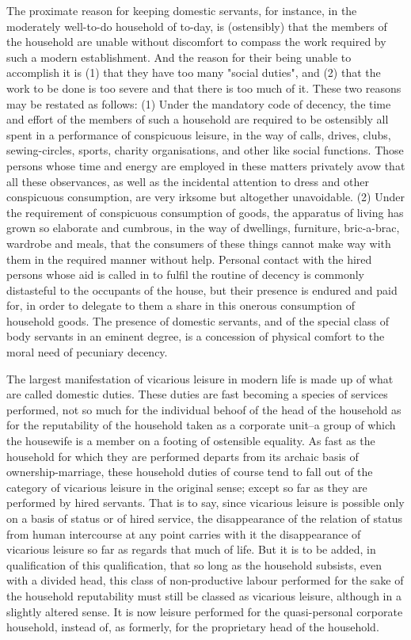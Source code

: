 \documentclass[12pt]{report}
\begin{document}
The proximate reason for keeping domestic servants, for instance, in
the moderately well-to-do household of to-day, is (ostensibly) that the
members of the household are unable without discomfort to compass the
work required by such a modern establishment. And the reason for their
being unable to accomplish it is (1) that they have too many "social
duties", and (2) that the work to be done is too severe and that there
is too much of it. These two reasons may be restated as follows: (1)
Under the mandatory code of decency, the time and effort of the members
of such a household are required to be ostensibly all spent in a
performance of conspicuous leisure, in the way of calls, drives, clubs,
sewing-circles, sports, charity organisations, and other like social
functions. Those persons whose time and energy are employed in these
matters privately avow that all these observances, as well as the
incidental attention to dress and other conspicuous consumption, are
very irksome but altogether unavoidable. (2) Under the requirement of
conspicuous consumption of goods, the apparatus of living has grown so
elaborate and cumbrous, in the way of dwellings, furniture, bric-a-brac,
wardrobe and meals, that the consumers of these things cannot make way
with them in the required manner without help. Personal contact with the
hired persons whose aid is called in to fulfil the routine of decency is
commonly distasteful to the occupants of the house, but their presence
is endured and paid for, in order to delegate to them a share in
this onerous consumption of household goods. The presence of domestic
servants, and of the special class of body servants in an eminent
degree, is a concession of physical comfort to the moral need of
pecuniary decency.

The largest manifestation of vicarious leisure in modern life is made
up of what are called domestic duties. These duties are fast becoming a
species of services performed, not so much for the individual behoof of
the head of the household as for the reputability of the household taken
as a corporate unit--a group of which the housewife is a member on a
footing of ostensible equality. As fast as the household for which they
are performed departs from its archaic basis of ownership-marriage,
these household duties of course tend to fall out of the category of
vicarious leisure in the original sense; except so far as they are
performed by hired servants. That is to say, since vicarious leisure
is possible only on a basis of status or of hired service, the
disappearance of the relation of status from human intercourse at any
point carries with it the disappearance of vicarious leisure so far as
regards that much of life. But it is to be added, in qualification of
this qualification, that so long as the household subsists, even with a
divided head, this class of non-productive labour performed for the
sake of the household reputability must still be classed as vicarious
leisure, although in a slightly altered sense. It is now leisure
performed for the quasi-personal corporate household, instead of, as
formerly, for the proprietary head of the household.
\end{document}
